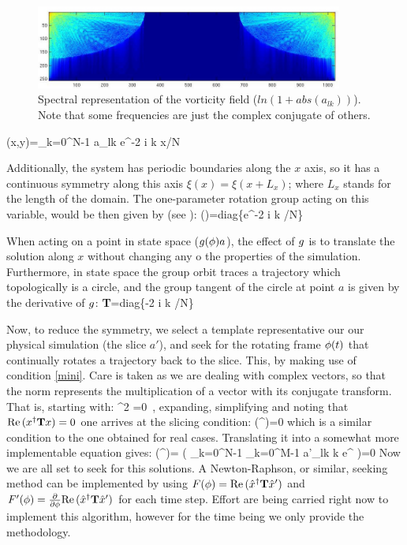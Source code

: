     \begin{figure}[t]
    \begin{center}
    \includegraphics[width=0.9\textwidth, clip=true]{fourier_example}
    \end{center}
    \caption{Spectral representation of the vorticity field
    ($ln(1+abs(a_{lk}))$). Note that some frequencies are just the complex
    conjugate of others.}
    \label{f:fouriervort3}
    \end{figure}

    \beq
    \xi(x,y)=\sum_{k=0}^{N-1} a_{lk} e^{-2 i \pi k x/N}

Additionally, the system has periodic boundaries along the $x$ axis, so
it has a continuous symmetry along this axis $\xi(x)=\xi(x+L_x)$; where
$L_x$ stands for the length of the domain. The one-parameter rotation
group acting on this variable, would be then given by (see
):
\beq
\LieEl(\gSpace)=\textrm{diag}\{e^{-2 i \pi k \gSpace/N}\}

When acting on a point in state space ($g({\bf \phi}) a$), the effect
of $g$ is to translate the solution along $x$ without changing any o
the properties of the simulation. Furthermore, in state space the group
orbit traces a trajectory which topologically is a circle, and the group
tangent of the circle at point $a$ is given by the derivative of
$g$:
\beq
\textbf{T}=\textrm{diag}\{-2 i \pi k /N\}

Now, to reduce the symmetry, we select a template representative our our
physical simulation (the slice $a'$), and seek for the rotating frame
${\bf \phi}(t)$ that continually rotates a trajectory back to the slice.
This, by making use of condition \ref{mini}. Care is taken as we are
dealing with complex vectors, so that the norm represents the
multiplication of a vector with its conjugate transform. That is,
starting with:
\beq
\frac{\partial}{\partial \gSpace} \norm{\ssp-\LieEl\slicep}^2 =0
\,,
expanding, simplifying and noting that ${\rm Re}\,(x^\dagger \mathbf{T} x)=0$ one
arrives at the slicing condition:
\beq
    \Re(\sspRed^\dagger \Lg \slicep)=0
which is a similar condition to the one obtained for real cases.
Translating it into a somewhat more implementable equation gives:
\beq
    \Re(\sspRed^\dagger \Lg \slicep)=
    \Re\left( \sum_{k=0}^{N-1} \sum_{k=0}^{M-1}
     a'_{lk} k e^{ \gSpace}
        \right)=0
Now we are all set to seek for this solutions. A Newton-Raphson, or
similar, seeking method can be implemented by using
$F({\bf \phi})={\rm Re}\,(\hat{x}^\dagger \mathbf{T} {\hat{x}'})$ and
$F'({\bf \phi})=\frac{\partial}{\partial {\bf \phi}}{\rm Re}\,(\hat{x}^\dagger \mathbf{T}
{\hat{x}'})$ for each time step. Effort are being carried right now to
implement this algorithm, however for the time being we only provide the
methodology.


